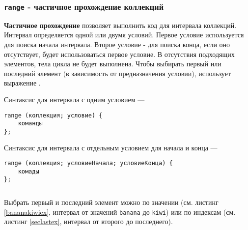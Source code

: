 \begin{sourcecode}
	\label{filterdataex}
    \inputminted[linenos]{icl}{../sources/filterdataex.icL}
\end{sourcecode}

\subsubsection{\texttt{range} - частичное прохождение коллекций}

{\bf Частичное прохождение} позволяет выполнить код для интервала коллекций. Интервал определяется одной или двумя условий. Первое условие используется для поиска начала интервала. Второе условие - для поиска конца, если оно отсутствует, будет использоваться первое условие. В отсутствия подходящих элементов, тела цикла не будет выполнена. Чтобы выбирать первый или последний элемент (в зависимость от предназначения условии), использует выражение \true{}.

Синтаксис для интервала с одним условием —
\begin{verbatim}
range (коллекция; условие) {
	команды
};
\end{verbatim}

Синтаксис для интервала с отдельным условием для начала и конца —
\begin{verbatim}
range (коллекция; условиеНачала; условиеКонца) {
	комады
};
\end{verbatim}

\begin{sourcecode}
	\label{filterindexex}
    \inputminted[linenos]{icl}{../sources/filterindexex.icL}
\end{sourcecode}

Выбрать первый и последний элемент можно по значении (см. листинг \ref{bananakiwiex}, интервал от значений \texttt{banana} до \texttt{kiwi}) или по индексам (см. листинг \ref{seclastex}, интервал от второго до последнего).

\begin{sourcecode}
	\label{bananakiwiex}
    \inputminted[linenos]{icl}{../sources/bananakiwiex.icL}
\end{sourcecode}

\begin{sourcecode}
	\label{seclastex}
    \inputminted[linenos]{icl}{../sources/seclastex.icL}
\end{sourcecode}

